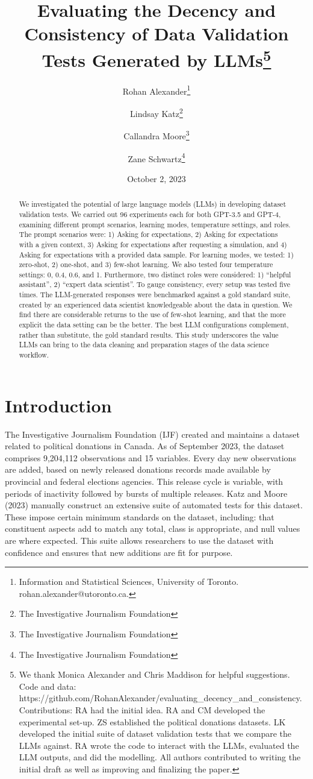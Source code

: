 \documentclass[
  letterpaper,
  DIV=11,
  numbers=noendperiod]{scrartcl}
\title{Evaluating the Decency and Consistency of Data Validation Tests
Generated by LLMs\thanks{We thank Monica Alexander and Chris Maddison
for helpful suggestions. Code and data:
https://github.com/RohanAlexander/evaluating\_decency\_and\_consistency.
Contributions: RA had the initial idea. RA and CM developed the
experimental set-up. ZS established the political donations datasets. LK
developed the initial suite of dataset validation tests that we compare
the LLMs against. RA wrote the code to interact with the LLMs, evaluated
the LLM outputs, and did the modelling. All authors contributed to
writing the initial draft as well as improving and finalizing the
paper.}}
\author{Rohan Alexander\footnote{Information and Statistical Sciences,
  University of Toronto. rohan.alexander@utoronto.ca.} \and Lindsay
Katz\footnote{The Investigative Journalism Foundation} \and Callandra
Moore\footnote{The Investigative Journalism Foundation} \and Zane
Schwartz\footnote{The Investigative Journalism Foundation}}
\date{October 2, 2023}
\begin{document}
\maketitle
\begin{abstract}
We investigated the potential of large language models (LLMs) in
developing dataset validation tests. We carried out 96 experiments each
for both GPT-3.5 and GPT-4, examining different prompt scenarios,
learning modes, temperature settings, and roles. The prompt scenarios
were: 1) Asking for expectations, 2) Asking for expectations with a
given context, 3) Asking for expectations after requesting a simulation,
and 4) Asking for expectations with a provided data sample. For learning
modes, we tested: 1) zero-shot, 2) one-shot, and 3) few-shot learning.
We also tested four temperature settings: 0, 0.4, 0.6, and 1.
Furthermore, two distinct roles were considered: 1) ``helpful
assistant'', 2) ``expert data scientist''. To gauge consistency, every
setup was tested five times. The LLM-generated responses were
benchmarked against a gold standard suite, created by an experienced
data scientist knowledgeable about the data in question. We find there
are considerable returns to the use of few-shot learning, and that the
more explicit the data setting can be the better. The best LLM
configurations complement, rather than substitute, the gold standard
results. This study underscores the value LLMs can bring to the data
cleaning and preparation stages of the data science workflow.
\end{abstract}
\ifdefined\Shaded\renewenvironment{Shaded}{\begin{tcolorbox}[boxrule=0pt, breakable, interior hidden, borderline west={3pt}{0pt}{shadecolor}, enhanced, sharp corners, frame hidden]}{\end{tcolorbox}}\fi

\hypertarget{introduction}{%
\section{Introduction}\label{introduction}}

The Investigative Journalism Foundation (IJF) created and maintains a
dataset related to political donations in Canada. As of September 2023,
the dataset comprises 9,204,112 observations and 15 variables. Every day
new observations are added, based on newly released donations records
made available by provincial and federal elections agencies. This
release cycle is variable, with periods of inactivity followed by bursts
of multiple releases. Katz and Moore (2023) manually construct an
extensive suite of automated tests for this dataset. These impose
certain minimum standards on the dataset, including: that constituent
aspects add to match any total, class is appropriate, and null values
are where expected. This suite allows researchers to use the dataset
with confidence and ensures that new additions are fit for purpose.
\end{document}
